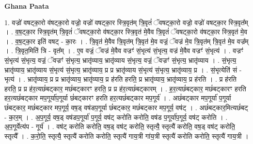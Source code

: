 \documentclass[17pt]{extarticle}
\begin{document}
\textbf{Ghana Paata } \newline

1. वज्रो॑ वषट्का॒रो व॑षट्का॒रो वज्रो॒ वज्रो॑ वषट्का॒र स्त्रि॒वृत॑म् त्रि॒वृतं॑ ॅवषट्का॒रो वज्रो॒ वज्रो॑ वषट्का॒र स्त्रि॒वृत᳚म् । . व॒ष॒ट्का॒र स्त्रि॒वृत॑म् त्रि॒वृतं॑ ॅवषट्का॒रो व॑षट्का॒र स्त्रि॒वृत॑ मे॒वैव त्रि॒वृतं॑ ॅवषट्का॒रो व॑षट्का॒र स्त्रि॒वृत॑ मे॒व । . व॒ष॒ट्का॒र इति॑ वषट् - का॒रः । . त्रि॒वृत॑ मे॒वैव त्रि॒वृत॑म् त्रि॒वृत॑ मे॒व वज्रं॒ ॅवज्र॑ मे॒व त्रि॒वृत॑म् त्रि॒वृत॑ मे॒व वज्र᳚म् । . त्रि॒वृत॒मिति॑ त्रि - वृत᳚म् । . ए॒व वज्रं॒ ॅवज्र॑ मे॒वैव वज्रꣳ॑ सं॒भृत्य॑ सं॒भृत्य॒ वज्र॑ मे॒वैव वज्रꣳ॑ सं॒भृत्य॑ । . वज्रꣳ॑ सं॒भृत्य॑ सं॒भृत्य॒ वज्रं॒ ॅवज्रꣳ॑ सं॒भृत्य॒ भ्रातृ॑व्याय॒ भ्रातृ॑व्याय सं॒भृत्य॒ वज्रं॒ ॅवज्रꣳ॑ सं॒भृत्य॒ भ्रातृ॑व्याय । . सं॒भृत्य॒ भ्रातृ॑व्याय॒ भ्रातृ॑व्याय सं॒भृत्य॑ सं॒भृत्य॒ भ्रातृ॑व्याय॒ प्र प्र भ्रातृ॑व्याय सं॒भृत्य॑ सं॒भृत्य॒ भ्रातृ॑व्याय॒ प्र । . सं॒भृत्येति॑ सं - भृत्य॑ । . भ्रातृ॑व्याय॒ प्र प्र भ्रातृ॑व्याय॒ भ्रातृ॑व्याय॒ प्र ह॑रति हरति॒ प्र भ्रातृ॑व्याय॒ भ्रातृ॑व्याय॒ प्र ह॑रति । . प्र ह॑रति हरति॒ प्र प्र ह॑र॒त्यछं॑बट्कार॒ मछं॑बट्कारꣳ हरति॒ प्र प्र ह॑र॒त्यछं॑बट्कारम् । . ह॒र॒त्यछं॑बट्कार॒ मछं॑बट्कारꣳ हरति हर॒त्यछं॑बट्कार मप॒गूर्या॑प॒गूर्या छं॑बट्कारꣳ हरति हर॒त्यछं॑बट्कार मप॒गूर्य॑ । . अछं॑बट्कार मप॒गूर्या॑ प॒गूर्या छं॑बट्कार॒ मछं॑बट्कार मप॒गूर्य॒ वष॒ड् वष॑डप॒गूर्या छं॑बट्कार॒ मछं॑बट्कार मप॒गूर्य॒ वष॑ट् । . अछं॑बट्कार॒मित्यछं॑बट् - का॒र॒म् । . अ॒प॒गूर्य॒ वष॒ड् वष॑डप॒गूर्या॑ प॒गूर्य॒ वष॑ट् करोति करोति॒ वष॑ड प॒गूर्या॑प॒गूर्य॒ वष॑ट् करोति । . अ॒प॒गूर्येत्य॑प - गूर्य॑ । . वष॑ट् करोति करोति॒ वष॒ड् वष॑ट् करोति॒ स्तृत्यै॒ स्तृत्यै॑ करोति॒ वष॒ड् वष॑ट् करोति॒ स्तृत्यै᳚ । . क॒रो॒ति॒ स्तृत्यै॒ स्तृत्यै॑ करोति करोति॒ स्तृत्यै॑ गाय॒त्री गा॑य॒त्री स्तृत्यै॑ करोति करोति॒ स्तृत्यै॑ गाय॒त्री । \newline
\end{document}
